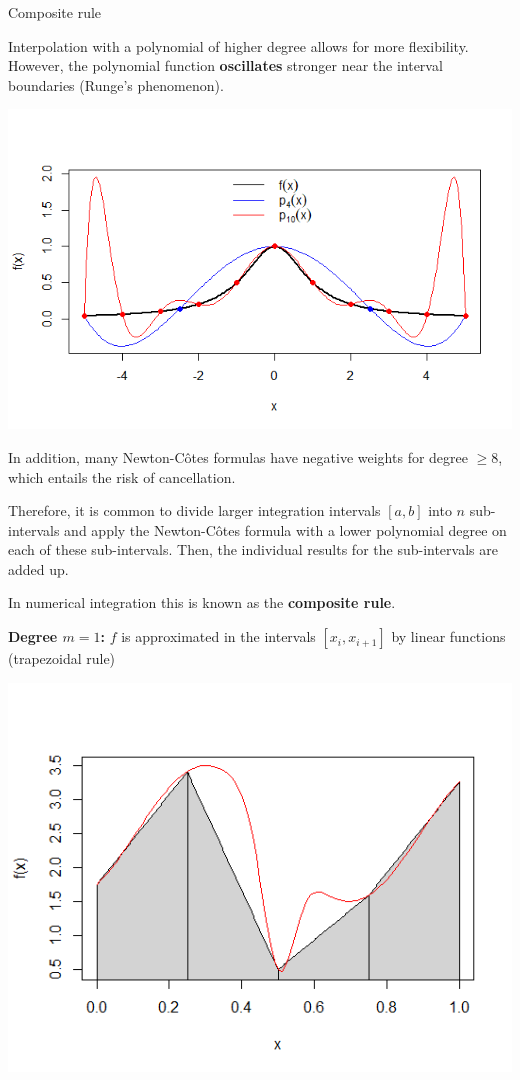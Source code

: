 \documentclass[11pt,compress,t,notes=noshow, xcolor=table]{beamer}
\begin{document}
\begin{vbframe}{Composite rule}

Interpolation with a polynomial of higher degree allows for more flexibility. However, the polynomial function \textbf{oscillates} stronger near the interval boundaries (Runge's phenomenon).

\begin{center}
\includegraphics[width = .8\textwidth]{figure_man/Runge.png}
\end{center}


\framebreak

In addition, many Newton-C\^{o}tes formulas have negative weights for degree $\geq 8$, which entails the risk of cancellation.

\lz

Therefore, it is common to divide larger integration intervals $[a, b]$ into $n$ sub-intervals and apply the Newton-C\^{o}tes formula with a lower polynomial degree on each of these sub-intervals. Then, the individual results for the sub-intervals are added up.

\lz

In numerical integration this is known as the \textbf{composite rule}.

\framebreak

\textbf{Degree $m = 1$:} $f$ is approximated in the intervals $[x_i, x_{i + 1}]$ by linear functions (trapezoidal rule)

\begin{center}
\includegraphics[width = .7\textwidth]{figure_man/deg1.png}
\end{center}


\end{vbframe}
\end{document}
